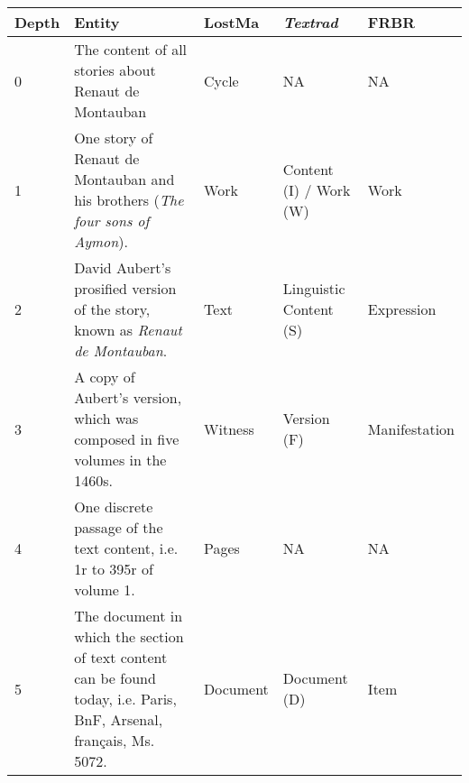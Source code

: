 \begin{center}
    \begin{tabular}
        {|p{}|p{}|p{}|p{}|p{}|}
        \hline
        \textbf{Depth} & \textbf{Entity} & \textbf{LostMa} & \textbf{\textit{Textrad}} & \textbf{FRBR} \\
        \hline
        0 & The content of all stories about Renaut de Montauban & Cycle & NA & NA \\
        \hline
        1 & One story of Renaut de Montauban and his brothers (\textit{The four sons of Aymon}). & Work & Content (I) / Work (W) & Work \\
        \hline
        2 & David Aubert's prosified version of the story, known as \textit{Renaut de Montauban}. & Text & Linguistic Content (S) & Expression  \\
        \hline
        3 & A copy of Aubert's version, which was composed in five volumes in the 1460s. & Witness & Version (F) & Manifestation \\
        \hline
        4 & One discrete passage of the text content, i.e. 1r to 395r of volume 1. & Pages & NA & NA \\
        \hline
        5 & The document in which the section of text content can be found today, i.e. Paris, BnF, Arsenal, français, Ms. 5072. & Document & Document (D) & Item \\
        \hline
    \end{tabular}
\end{center}